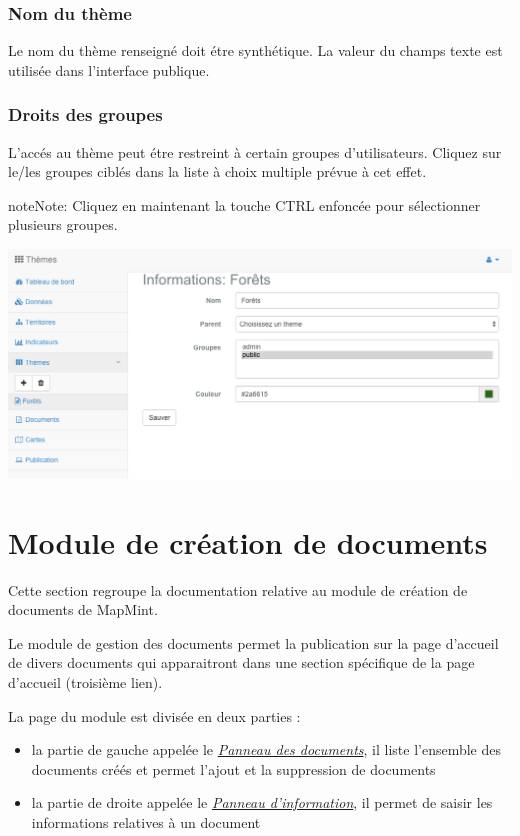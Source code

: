 \documentclass[letterpaper,10pt,french]{sphinxmanual}
\begin{document}
\subsection{Nom du thème}
\label{themes/infopanel:nom-du-theme}
Le nom du thème renseigné doit étre synthétique. La valeur du champs texte est utilisée dans l'interface publique.


\subsection{Droits des groupes}
\label{themes/infopanel:droits-des-groupes}
L'accés au thème peut étre restreint à certain groupes d'utilisateurs. Cliquez sur le/les groupes ciblés dans la liste à choix multiple prévue à cet effet.

\begin{notice}{note}{Note:}
Cliquez en maintenant la touche CTRL enfoncée pour sélectionner plusieurs groupes.
\end{notice}

\includegraphics[width=1.000\linewidth]{theme-module-preview.png}


\chapter{Module de création de documents}
\label{documents/index:module-de-creation-de-documents}\label{documents/index:documents}\label{documents/index::doc}
Cette section regroupe la documentation relative au module de création de documents de MapMint.

Le module de gestion des documents permet la publication sur la page
d'accueil de divers documents qui apparaitront dans une section
spécifique de la page d'accueil (troisième lien).

La page du module est divisée en deux parties :
\begin{itemize}
\item {} 
la partie de gauche appelée le {\hyperref[documents/docslist::doc]{\emph{\emph{Panneau des documents}}}}, il liste l'ensemble des documents créés et permet l'ajout et la suppression de documents

\item {} 
la partie de droite appelée le {\hyperref[documents/infopanel::doc]{\emph{\emph{Panneau d'information}}}}, il permet de saisir les informations relatives à un document

\end{itemize}
\end{document}
